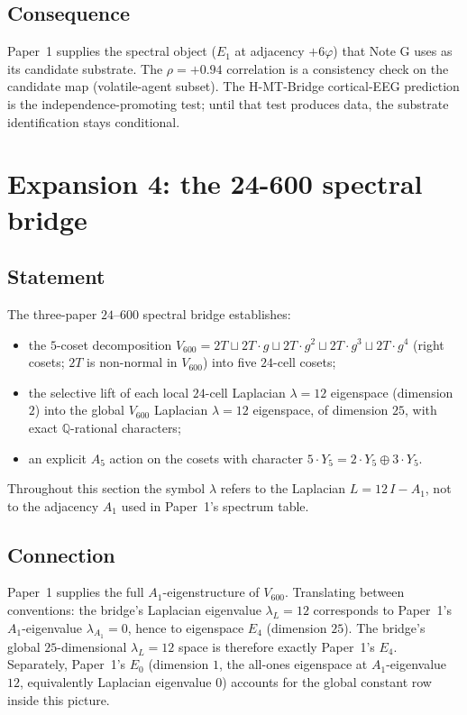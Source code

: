 \documentclass[11pt,a4paper]{article}
\theoremstyle{definition}
\theoremstyle{remark}
\begin{document}
\subsection*{Consequence}

Paper~1 supplies the spectral object ($E_1$ at adjacency $+6\varphi$)
that Note G uses as its candidate substrate. The $\rho = +0.94$
correlation is a consistency check on the candidate map (volatile-agent
subset). The H-MT-Bridge cortical-EEG prediction is the
independence-promoting test; until that test produces data, the substrate
identification stays conditional.

\bigskip

\section{Expansion 4: the 24-600 spectral bridge}\label{sec:24600}

\subsection*{Statement}

The three-paper $24$--$600$ spectral bridge
\cite{schlafliBridge,spectralBridge24600,bridgeSynthesis} establishes:
\begin{itemize}
  \item the $5$-coset decomposition $V_{600} = 2T \sqcup 2T\!\cdot\! g \sqcup 2T\!\cdot\! g^2 \sqcup 2T\!\cdot\! g^3 \sqcup 2T\!\cdot\! g^4$
    (right cosets; $2T$ is non-normal in $V_{600}$) into five $24$-cell cosets;
  \item the selective lift of each local $24$-cell Laplacian
    $\lambda = 12$ eigenspace (dimension $2$) into the global $V_{600}$
    Laplacian $\lambda = 12$ eigenspace, of dimension $25$, with exact
    $\mathbb{Q}$-rational characters;
  \item an explicit $A_5$ action on the cosets with character
    $5 \cdot Y_5 = 2 \cdot Y_5 \oplus 3 \cdot Y_5$.
\end{itemize}

Throughout this section the symbol $\lambda$ refers to the
Laplacian $L = 12\, I - A_1$, not to the adjacency $A_1$ used in
Paper~1's spectrum table.

\subsection*{Connection}

Paper~1 supplies the full $A_1$-eigenstructure of $V_{600}$.
Translating between conventions: the bridge's
Laplacian eigenvalue $\lambda_L = 12$ corresponds to Paper~1's
$A_1$-eigenvalue $\lambda_{A_1} = 0$, hence to eigenspace $E_4$
(dimension $25$). The bridge's global $25$-dimensional $\lambda_L = 12$
space is therefore exactly Paper~1's $E_4$. Separately, Paper~1's
$E_0$ (dimension $1$, the all-ones eigenspace at $A_1$-eigenvalue $12$,
equivalently Laplacian eigenvalue $0$) accounts for the global constant
row inside this picture.
\end{document}
